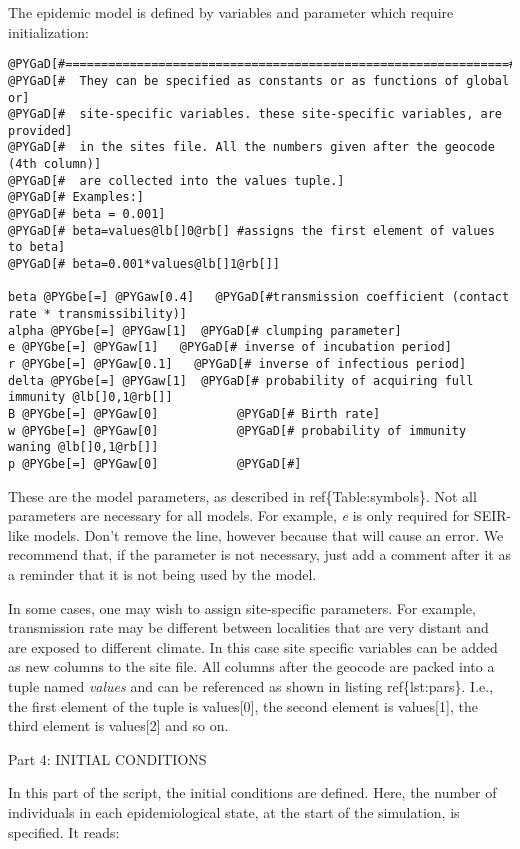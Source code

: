 \documentclass[a4paper,10pt]{manual}
\begin{document}
The epidemic model is defined by variables and parameter which require initialization:

\begin{Verbatim}[commandchars=@\[\]]
@PYGaD[#==============================================================#]
@PYGaD[#  They can be specified as constants or as functions of global or]
@PYGaD[#  site-specific variables. these site-specific variables, are provided]
@PYGaD[#  in the sites file. All the numbers given after the geocode (4th column)]
@PYGaD[#  are collected into the values tuple.]
@PYGaD[# Examples:]
@PYGaD[# beta = 0.001]
@PYGaD[# beta=values@lb[]0@rb[] #assigns the first element of values to beta]
@PYGaD[# beta=0.001*values@lb[]1@rb[]]

beta @PYGbe[=] @PYGaw[0.4]   @PYGaD[#transmission coefficient (contact rate * transmissibility)]
alpha @PYGbe[=] @PYGaw[1]  @PYGaD[# clumping parameter]
e @PYGbe[=] @PYGaw[1]   @PYGaD[# inverse of incubation period]
r @PYGbe[=] @PYGaw[0.1]   @PYGaD[# inverse of infectious period]
delta @PYGbe[=] @PYGaw[1]  @PYGaD[# probability of acquiring full immunity @lb[]0,1@rb[]]
B @PYGbe[=] @PYGaw[0]           @PYGaD[# Birth rate]
w @PYGbe[=] @PYGaw[0]           @PYGaD[# probability of immunity waning @lb[]0,1@rb[]]
p @PYGbe[=] @PYGaw[0]           @PYGaD[#]
\end{Verbatim}

These are the model parameters, as described in ref\{Table:symbols\}. Not all parameters are necessary for all models. For example, \emph{e} is only required for SEIR-like models. Don't
remove the line, however because that will cause an error. We recommend that, if the parameter is not necessary, just add a comment after it as a reminder that it is not being used by the model.

In some cases, one may wish to assign site-specific parameters. For example, transmission rate may be different between localities that are very distant and are exposed to different climate. In this case site specific variables can be added as new columns to the site file. All columns after the geocode are packed into a tuple named \emph{values} and can be referenced as shown in listing ref\{lst:pars\}. I.e., the first element of the tuple is values{[}0{]}, the second element is values{[}1{]}, the third element is values{[}2{]} and so on.

Part 4: INITIAL CONDITIONS

In this part of the script, the initial conditions are defined. Here, the number of individuals in each epidemiological state, at the start of the simulation, is specified. It reads:
\end{document}
